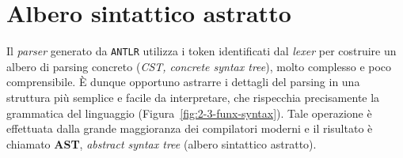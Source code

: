 \section{Albero sintattico astratto}
\label{sec:5-4-abstract-syntax-tree}

Il \textit{parser} generato da \texttt{ANTLR} utilizza i token identificati dal \textit{lexer} per costruire
un albero di parsing concreto (\textit{CST, concrete syntax tree}), molto complesso e poco comprensibile.
È dunque opportuno astrarre i dettagli del parsing in una struttura più semplice e facile da interpretare,
che rispecchia precisamente la grammatica del linguaggio (Figura~\ref{fig:2-3-funx-syntax}).
Tale operazione è effettuata dalla grande maggioranza dei compilatori moderni e il risultato è chiamato
\textbf{AST}, \textit{abstract syntax tree} (albero sintattico astratto).



\newpage


